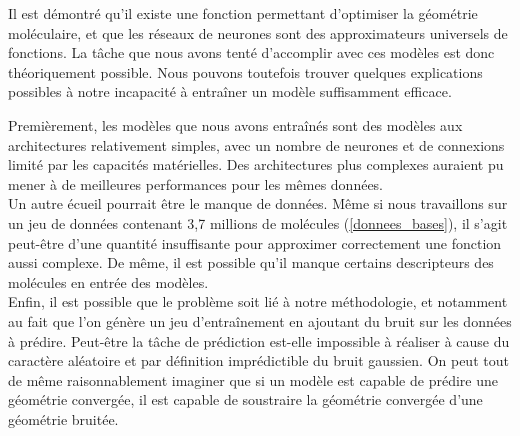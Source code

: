 \par Il est démontré qu'il existe une fonction permettant d'optimiser la géométrie moléculaire, et que les réseaux de neurones sont des approximateurs universels de fonctions\cite{universal_approx}. La tâche que nous avons tenté d'accomplir avec ces modèles est donc théoriquement possible. Nous pouvons toutefois trouver quelques explications possibles à notre incapacité à entraîner un modèle suffisamment efficace. 

\par Premièrement, les modèles que nous avons entraînés sont des modèles aux architectures relativement simples, avec un nombre de neurones et de connexions limité par les capacités matérielles. Des architectures plus complexes auraient pu mener à de meilleures performances pour les mêmes données. \\
Un autre écueil pourrait être le manque de données. Même si nous travaillons sur un jeu de données contenant 3,7 millions de molécules (\ref{donnees_bases}), il s'agit peut-être d'une quantité insuffisante pour approximer correctement une fonction aussi complexe. De même, il est possible qu'il manque certains descripteurs des molécules en entrée des modèles.\\
Enfin, il est possible que le problème soit lié à notre méthodologie, et notamment au fait que l'on génère un jeu d'entraînement en ajoutant du bruit sur les données à prédire. Peut-être la tâche de prédiction est-elle impossible à réaliser à cause du caractère aléatoire et par définition imprédictible du bruit gaussien. On peut tout de même raisonnablement imaginer que si un modèle est capable de prédire une géométrie convergée, il est capable de soustraire la géométrie convergée d'une géométrie bruitée.